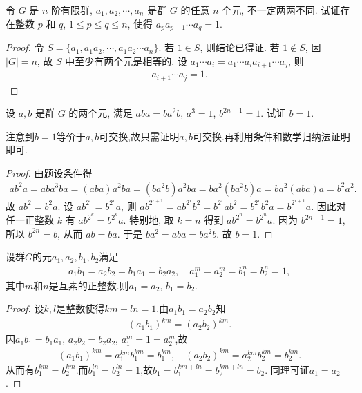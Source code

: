 \documentclass[../../main.tex]{subfiles}%
\begin{document}
\begin{example}
令 $G$ 是 $n$ 阶有限群, $a_1,a_2,\cdots,a_n$ 是群 $G$ 的任意 $n$ 个元, 不一定两两不同. 试证存在整数 $p$ 和 $q$, $1 \leqslant p \leqslant q \leqslant n$, 使得 $a_pa_{p+1}\cdots a_q = 1$.
\end{example}
\begin{proof}

令 $S = \{a_1,a_1a_2,\cdots,a_1a_2\cdots a_n\}$. 若 $1 \in S$, 则结论已得证. 若 $1 \notin S$, 因 $|G|=n$, 故 $S$ 中至少有两个元是相等的. 设 $a_1\cdots a_i = a_1\cdots a_i a_{i+1}\cdots a_j$, 则
\begin{align*}
a_{i+1}\cdots a_j = 1.
\end{align*}

\end{proof}

\begin{example}
设 $a,b$ 是群 $G$ 的两个元, 满足 $aba = ba^2b$, $a^3 = 1$, $b^{2n-1} = 1$. 试证 $b = 1$.
\end{example}
\begin{note}
注意到$b=1$等价于$a,b$可交换,故只需证明$a,b$可交换.再利用条件和数学归纳法证明即可.
\end{note}
\begin{proof}

由题设条件得
\begin{align*}
ab^2a = aba^3ba = (aba)a^2ba = (ba^2b)a^2ba = ba^2(ba^2b)a = ba^2(aba)a = b^2a^2.
\end{align*}
故 $ab^2 = b^2a$. 设 $ab^{2^r} = b^{2^r}a$, 则 $ab^{2^{r+1}} = ab^{2^r}b^2 = b^{2^r}ab^2 = b^{2^r}b^2a = b^{2^{r+1}}a$. 因此对任一正整数 $k$ 有 $ab^{2^k} = b^{2^k}a$. 特别地, 取 $k = n$ 得到 $ab^{2^n} = b^{2^n}a$. 因为 $b^{2n-1} = 1$, 所以 $b^{2n} = b$, 从而 $ab = ba$. 于是 $ba^2 = aba = ba^2b$. 故 $b = 1$.

\end{proof}

\begin{example}
设群$G$的元$a_1,a_2,b_1,b_2$满足
\begin{align*}
a_1b_1 = a_2b_2 = b_1a_1 = b_2a_2,\quad a_1^m = a_2^m = b_1^n = b_2^n = 1,
\end{align*}
其中$m$和$n$是互素的正整数.则$a_1 = a_2$, $b_1 = b_2$.
\end{example}
\begin{proof}

设$k,l$是整数使得$km + ln = 1$.由$a_1b_1 = a_2b_2$知
\begin{align*}
(a_1b_1)^{km} = (a_2b_2)^{km}.
\end{align*}
因$a_1b_1 = b_1a_1$, $a_2b_2 = b_2a_2$, $a_1^m = 1 = a_2^m$,故
\begin{align*}
(a_1b_1)^{km} = a_1^{km}b_1^{km} = b_1^{km},\quad (a_2b_2)^{km} = a_2^{km}b_2^{km} = b_2^{km}.
\end{align*}
从而有$b_1^{km} = b_2^{km}$.而$b_1^{ln} = b_2^{ln} = 1$,故$b_1 = b_1^{km+ln} = b_2^{km+ln} = b_2$.
同理可证$a_1 = a_2$.

\end{proof}
\end{document}
